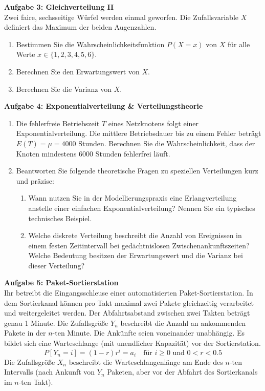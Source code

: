 \documentclass[11pt,a4paper]{article}
\begin{document}
\vspace{0.5cm}

\textbf{Aufgabe 3: Gleichverteilung II} \\
Zwei faire, sechsseitige Würfel werden einmal geworfen. Die Zufallsvariable $X$ definiert das Maximum der beiden Augenzahlen.
\begin{enumerate}
    \item[a)] Bestimmen Sie die Wahrscheinlichkeitsfunktion $P(X=x)$ von $X$ für alle Werte $x \in \{1, 2, 3, 4, 5, 6\}$.
    \item[b)] Berechnen Sie den Erwartungswert von $X$.
    \item[c)] Berechnen Sie die Varianz von $X$.
\end{enumerate}

\vspace{0.5cm}

\textbf{Aufgabe 4: Exponentialverteilung \& Verteilungstheorie} \\
\begin{enumerate}
    \item[a)] Die fehlerfreie Betriebszeit $T$ eines Netzknotens folgt einer Exponentialverteilung. Die mittlere Betriebsdauer bis zu einem Fehler beträgt $E(T) = \mu = 4000$ Stunden. Berechnen Sie die Wahrscheinlichkeit, dass der Knoten mindestens 6000 Stunden fehlerfrei läuft.
    \item[b)] Beantworten Sie folgende theoretische Fragen zu speziellen Verteilungen kurz und präzise:
    \begin{enumerate}
        \item[1.] Wann nutzen Sie in der Modellierungspraxis eine Erlangverteilung anstelle einer einfachen Exponentialverteilung? Nennen Sie ein typisches technisches Beispiel.
        \item[2.] Welche diskrete Verteilung beschreibt die Anzahl von Ereignissen in einem festen Zeitintervall bei gedächtnislosen Zwischenankunftszeiten? Welche Bedeutung besitzen der Erwartungswert und die Varianz bei dieser Verteilung?
    \end{enumerate}
\end{enumerate}

\newpage

\textbf{Aufgabe 5: Paket-Sortierstation} \\
Ihr betreibt die Eingangsschleuse einer automatisierten Paket-Sortierstation. In dem Sortierkanal können pro Takt maximal zwei Pakete gleichzeitig verarbeitet und weitergeleitet werden. Der Abfahrtsabstand zwischen zwei Takten beträgt genau 1 Minute. Die Zufallsgröße $Y_n$ beschreibt die Anzahl an ankommenden Pakete in der $n$-ten Minute. Die Ankünfte seien voneinander unabhängig. Es bildet sich eine Warteschlange (mit unendlicher Kapazität) vor der Sortierstation.
\[
P[Y_n = i] = (1-r)r^i = a_i \quad \text{für } i \ge 0 \text{ und } 0 < r < 0.5
\]
Die Zufallsgröße $X_n$ beschreibt die Warteschlangenlänge am Ende des $n$-ten Intervalls (nach Ankunft von $Y_n$ Paketen, aber vor der Abfahrt des Sortierkanals im $n$-ten Takt).
\end{document}
